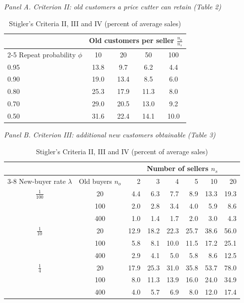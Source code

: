 \begin{table}[htbp]
\centering
\caption{Stigler's Criteria II, III and IV (percent of average sales)}
\label{tab:02-stigler-t234}
\small
{\textit{Panel A. Criterion II: old customers a price cutter can retain (Table 2)}}\par\smallskip
\begin{tabular}{@{}lcccc@{}}
\toprule
& \multicolumn{4}{c}{Old customers per seller $\frac{n_o}{n_s}$} \\
\cmidrule(l){2-5}
Repeat probability $\phi$ & 10 & 20 & 50 & 100 \\
\midrule
0.95 & 13.8 & 9.7  & 6.2  & 4.4  \\
0.90 & 19.0 & 13.4 & 8.5  & 6.0  \\
0.80 & 25.3 & 17.9 & 11.3 & 8.0  \\
0.70 & 29.0 & 20.5 & 13.0 & 9.2  \\
0.50 & 31.6 & 22.4 & 14.1 & 10.0 \\
\bottomrule
\end{tabular}

\medskip
{\textit{Panel B. Criterion III: additional new customers obtainable (Table 3)}}\par\smallskip
\begin{tabular}{@{}cc*{6}{r}@{}}
\toprule
& & \multicolumn{6}{c}{Number of sellers $n_s$} \\
\cmidrule(l){3-8}
New-buyer rate $\lambda$ & Old buyers $n_o$ & 2 & 3 & 4 & 5 & 10 & 20 \\
\midrule
$\frac{1}{100}$ & 20  & 4.4 & 6.3 & 7.7 & 8.9 & 13.3 & 19.3 \\
                & 100 & 2.0 & 2.8 & 3.4 & 4.0 & 5.9  & 8.6  \\
                & 400 & 1.0 & 1.4 & 1.7 & 2.0 & 3.0  & 4.3  \\
\addlinespace
$\frac{1}{10}$  & 20  & 12.9 & 18.2 & 22.3 & 25.7 & 38.6 & 56.0 \\
                & 100 & 5.8  & 8.1  & 10.0 & 11.5 & 17.2 & 25.1 \\
                & 400 & 2.9  & 4.1  & 5.0  & 5.8  & 8.6  & 12.5 \\
\addlinespace
$\frac{1}{4}$   & 20  & 17.9 & 25.3 & 31.0 & 35.8 & 53.7 & 78.0 \\
                & 100 & 8.0  & 11.3 & 13.9 & 16.0 & 24.0 & 34.9 \\
                & 400 & 4.0  & 5.7  & 6.9  & 8.0  & 12.0 & 17.4 \\
\bottomrule
\end{tabular}


\end{table}
